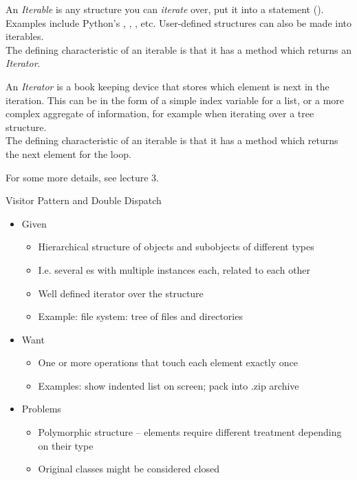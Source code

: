 \begin{frame}
%
\begin{recapbox}
An \emph{Iterable} is any structure you can \emph{iterate} over, \ie put it into a  statement (). Examples include Python's , , , etc. User-defined structures can also be made into iterables.\\
The defining characteristic of an iterable is that it has a  method which returns an \emph{Iterator}.

\vspace{3pt}
An \emph{Iterator} is a book keeping device that stores which element is next in the iteration. This can be in the form of a simple index variable for a list, or a more complex aggregate of information, for example when iterating over a tree structure.\\
The defining characteristic of an iterable is that it has a  method which returns the next element for the  loop.

\vspace{3pt}
For some more details, see lecture 3.
\end{recapbox}
%
\end{frame}


\begin{frame}{Visitor Pattern and Double Dispatch}
%
\begin{itemize}
\item Given
	\begin{itemize}
	\item Hierarchical structure of objects and subobjects of different types
	\item I.\;e. several es with multiple instances each, related to each other
	\item Well defined iterator over the structure
	\item Example: file system: tree of files and directories
	\end{itemize}
\item Want
	\begin{itemize}
	\item One or more operations that touch each element exactly once
	\item Examples: show indented list on screen; pack into .zip archive
	\end{itemize}
\item Problems
	\begin{itemize}
	\item Polymorphic structure -- elements require different treatment depending on their type
	\item Original classes might be considered closed
	\end{itemize}
\end{itemize}
%
\end{frame}

